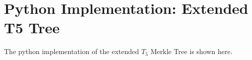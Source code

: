 \chapter{Python Implementation: Extended T5 Tree}
The python implementation of the extended $T_5$ Merkle Tree is shown here.



